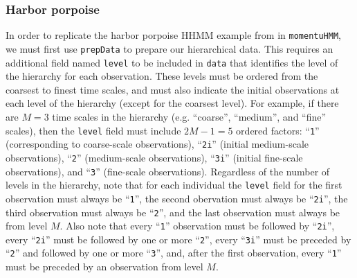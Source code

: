 \documentclass[12pt]{article}\usepackage[]{graphicx}\usepackage[]{xcolor}
\begin{document}
\subsubsection{Harbor porpoise}
\label{sec:harborPorpoise}
In order to replicate the harbor porpoise HHMM example from \cite{Leos-BarajasEtAl2017} in \verb|momentuHMM|, we must first use \verb|prepData| to prepare our hierarchical data. This requires an additional field named \verb|level| to be included in \verb|data| that identifies the level of the hierarchy for each observation. These levels must be ordered from the coarsest to finest time scales, and must also indicate the initial observations at each level of the hierarchy (except for the coarsest level).  For example, if there are $M=3$ time scales in the hierarchy (e.g. ``coarse'', ``medium'', and ``fine'' scales), then the \verb|level| field must include $2M-1=5$ ordered factors: ``\verb|1|'' (corresponding to coarse-scale observations), ``\verb|2i|'' (initial medium-scale observations), ``\verb|2|'' (medium-scale observations), ``\verb|3i|'' (initial fine-scale observations), and ``\verb|3|'' (fine-scale observations). Regardless of the number of levels in the hierarchy, note that for each individual the \verb|level| field for the first observation must always be ``\verb|1|'', the second obervation must always be ``\verb|2i|'', the third observation must always be ``\verb|2|'', and the last observation must always be from level $M$. Also note that every ``\verb|1|'' observation must be followed by ``\verb|2i|'', every ``\verb|2i|'' must be followed by one or more ``\verb|2|'', every ``\verb|3i|'' must be preceded by ``\verb|2|'' and followed by one or more ``\verb|3|'', and, after the first observation, every ``\verb|1|'' must be preceded by an observation from level $M$.
\end{document}
